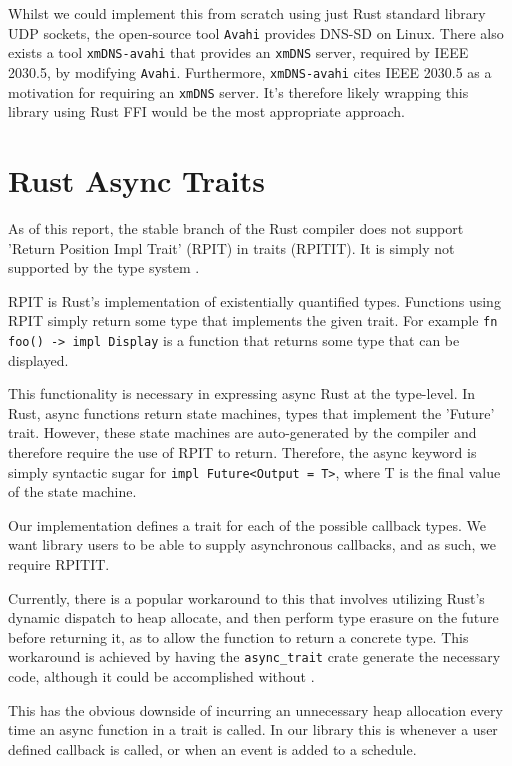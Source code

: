 Whilst we could implement this from scratch using just Rust standard library UDP sockets, the open-source tool \texttt{Avahi} provides DNS-SD on Linux. There also exists a tool \texttt{xmDNS-avahi} that provides an \texttt{xmDNS} server, required by IEEE 2030.5, by modifying \texttt{Avahi}. Furthermore, \texttt{xmDNS-avahi} cites IEEE 2030.5 as a motivation for requiring an \texttt{xmDNS} server. 
It's therefore likely wrapping this library using Rust FFI would be the most appropriate approach. \cite{avahi} \cite{xmdnsavahi} 

\section{Rust Async Traits}
As of this report, the stable branch of the Rust compiler does not support 'Return Position Impl Trait' (RPIT) in traits (RPITIT). It is simply not supported by the type system \cite{rustRPITIT}.

RPIT is Rust's implementation of existentially quantified types. Functions using RPIT simply return some type that implements the given trait. For example \texttt{fn foo() -> impl Display} is a function that returns some type that can be displayed.

This functionality is necessary in expressing async Rust at the type-level. In Rust, async functions return state machines, types that implement the 'Future' trait. However, these state machines are auto-generated by the compiler and therefore require the use of RPIT to return. Therefore, the async keyword is simply syntactic sugar for \texttt{impl Future<Output = T>}, where T is the final value of the state machine.

Our implementation defines a trait for each of the possible callback types. We want library users to be able to supply asynchronous callbacks, and as such, we require RPITIT.

Currently, there is a popular workaround to this that involves utilizing Rust's dynamic dispatch to heap allocate, and then perform type erasure on the future before returning it, as to allow the function to return a concrete type. This workaround is achieved by having the \texttt{async\_trait} crate generate the necessary code, although it could be accomplished without \cite{asynctrait}. 

This has the obvious downside of incurring an unnecessary heap allocation every time an async function in a trait is called. In our library this is whenever a user defined callback is called, or when an event is added to a schedule.


